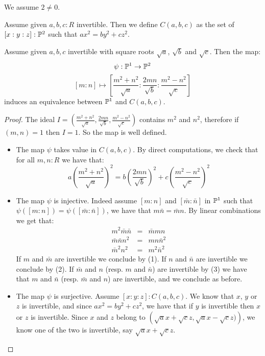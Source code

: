 We assume $2\not=0$.

\begin{definition}
Assume given $a,b,c:R$ invertible. Then we define $C(a,b,c)$ as the set of $[x:y:z]:\mathbb{P}^2$ such that $ax^2=by^2+cz^2$.
\end{definition}

\begin{lemma}\label{severi-example-with-roots}
Assume given $a,b,c$ invertible with square roots $\sqrt{a}$, $\sqrt{b}$ and $\sqrt{c}$. Then the map:
\[\psi:\mathbb{P}^1\to \mathbb{P}^2\]
\[ [m:n]\mapsto \left[\frac{m^2+n^2}{\sqrt{a}} : \frac{2mn}{\sqrt{b}} : \frac{m^2-n^2}{\sqrt{c}}\right] \]
induces an equivalence between $\mathbb{P}^1$ and $C(a,b,c)$.
\end{lemma}

\begin{proof}
The ideal $I = \left(\frac{m^2+n^2}{\sqrt{a}}, \frac{2mn}{\sqrt{b}}, \frac{m^2-n^2}{\sqrt{c}}\right)$ contains $m^2$ and $n^2$, therefore if $(m,n)=1$ then $I=1$. So the map is well defined.
\begin{itemize}

\item The map $\psi$ takes value in $C(a,b,c)$. By direct computations, we check that for all $m,n:R$ we have that:
\[a\left(\frac{m^2+n^2}{\sqrt{a}}\right)^2 = b\left(\frac{2mn}{\sqrt{b}}\right)^2 + c\left(\frac{m^2-n^2}{\sqrt{c}}\right)^2\]

\item The map $\psi$ is injective. Indeed assume $[m:n]$ and $[\bar{m}:\bar{n}]$ in $\mathbb{P}^1$ such that $\psi([m:n])=\psi([\bar{m}:\bar{n}])$, we have that $m\bar{n}=\bar{m}n$. By linear combinations we get that:
\begin{eqnarray}
m^2\bar{m}\bar{n} &=& \bar{m}mn\\
\bar{m}\bar{n}n^2 &=& mn\bar{n}^2\\
\bar{m}^2n^2 &=& m^2\bar{n}^2
\end{eqnarray}
If $m$ and $\bar{m}$ are invertible we conclude by (1). If $n$ and $\bar{n}$ are invertible we conclude by (2). If $\bar{m}$ and $n$ (resp. $m$ and $\bar{n}$) are invertible by (3) we have that $m$ and $\bar{n}$ (resp. $\bar{m}$ and $n$) are invertible, and we conclude as before.

\item The map $\psi$ is surjective. Assume $[x:y:z]:C(a,b,c)$. We know that $x$, $y$ or $z$ is invertible, and since $ax^2=by^2+cz^2$, we have that if $y$ is invertible then $x$ or $z$ is invertible. Since $x$ and $z$ belong to $\left(\sqrt{a}x+\sqrt{c}z, \sqrt{a}x-\sqrt{c}z)\right)$, we know one of the two is invertible, say $\sqrt{a}x+\sqrt{c}z$. 


\end{itemize}
\end{proof}
